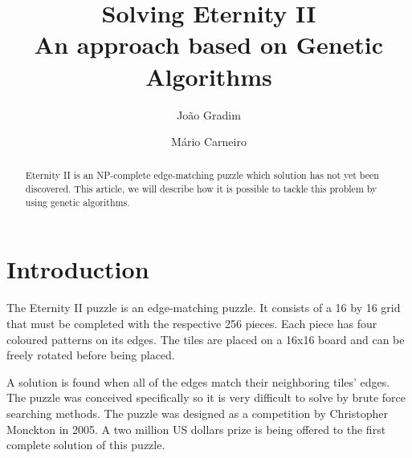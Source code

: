 \documentclass{llncs}
\begin{document}
%
\frontmatter          %
%
\pagestyle{headings}  %
%

\mainmatter              %
%
\title{Solving Eternity II\\
    \small{An approach based on Genetic Algorithms}
  }
  \author{João Gradim \and Mário Carneiro}
%
%

\maketitle              %

\begin{abstract}
Eternity II is an NP-complete edge-matching puzzle which solution has not yet been discovered. This article, we will describe how it is possible to tackle this problem by using genetic algorithms.
\end{abstract}
%
\section{Introduction}\label{sec:introduction}

The Eternity II puzzle is an edge-matching puzzle. It consists of a 16 by 16 grid that must be completed with the respective 256 pieces. Each piece has four coloured patterns on its edges. The tiles are placed on a 16x16 board and can be freely rotated before being placed.

A solution is found when all of the edges match their neighboring tiles' edges. The puzzle was conceived specifically so it is very difficult to solve by brute force searching methods. The puzzle was designed as a competition by Christopher Monckton in 2005. A two million US dollars prize is being offered to the first complete solution of this puzzle.\cite{unsolved}
\end{document}
